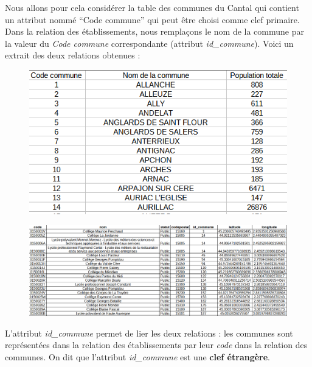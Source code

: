 \documentclass[
  a4paper,
  DIV=11,
  numbers=noendperiod]{scrartcl}
\begin{document}
Nous allons pour cela considérer la table des communes du Cantal qui
contient un attribut nommé ``Code commune'' qui peut être choisi comme
clef primaire. Dans la relation des établissements, nous remplaçons le
nom de la commune par la valeur du \emph{Code commune} correspondante
(attribut \emph{id\_commune}). Voici un extrait des deux relations
obtenues :

\begin{figure}

{\centering \includegraphics{BDD7.png}

}

\end{figure}

\begin{figure}

{\centering \includegraphics{BDD8.png}

}

\end{figure}

L'attribut \emph{id\_commune} permet de lier les deux relations : les
communes sont représentées dans la relation des établissements par leur
\emph{code} dans la relation des communes. On dit que l'attribut
\emph{id\_commune} est une \textbf{clef étrangère}.
\end{document}
